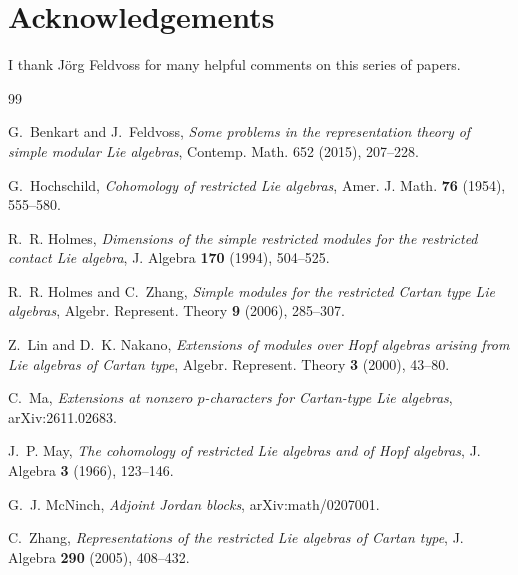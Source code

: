 \documentclass[11pt]{article}
\theoremstyle{plain}
\theoremstyle{definition}
\theoremstyle{remark}
\numberwithin{equation}{section}
\begin{document}
\section*{Acknowledgements}

I thank J\"org Feldvoss for many helpful comments on this series of papers.

\begin{thebibliography}{99}

G.~Benkart and J.~Feldvoss,
\emph{Some problems in the representation theory of simple modular Lie algebras},
Contemp. Math. 652 (2015), 207--228.

G.~Hochschild,
\emph{Cohomology of restricted Lie algebras},
Amer. J. Math. \textbf{76} (1954), 555--580.

R.~R. Holmes,
\emph{Dimensions of the simple restricted modules for the restricted contact Lie algebra},
J. Algebra \textbf{170} (1994), 504--525.

R.~R. Holmes and C.~Zhang,
\emph{Simple modules for the restricted Cartan type Lie algebras},
Algebr. Represent. Theory \textbf{9} (2006), 285--307.

Z.~Lin and D.~K. Nakano,
\emph{Extensions of modules over Hopf algebras arising from Lie algebras of Cartan type},
Algebr. Represent. Theory \textbf{3} (2000), 43--80.


C.~Ma,
\emph{Extensions at nonzero $p$-characters for Cartan-type Lie algebras},
arXiv:2611.02683.

J.~P. May,
\emph{The cohomology of restricted Lie algebras and of Hopf algebras},
J. Algebra \textbf{3} (1966), 123--146.

G.~J. McNinch,
\emph{Adjoint Jordan blocks},
arXiv:math/0207001.

C.~Zhang,
\emph{Representations of the restricted Lie algebras of Cartan type},
J. Algebra \textbf{290} (2005), 408--432.

\end{thebibliography}
\end{document}
